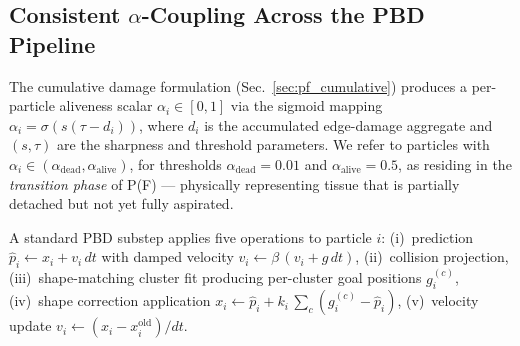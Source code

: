 %
%
%

\subsection{Consistent \texorpdfstring{$\alpha$}{α}-Coupling Across the PBD Pipeline}
\label{sec:alpha_coupling}

The cumulative damage formulation (Sec.~\ref{sec:pf_cumulative}) produces a
per-particle aliveness scalar $\alpha_i \in [0,1]$ via the sigmoid mapping
$\alpha_i = \sigma(s(\tau - d_i))$, where $d_i$ is the accumulated edge-damage
aggregate and $(s, \tau)$ are the sharpness and threshold parameters. We refer
to particles with $\alpha_i \in (\alpha_{\text{dead}}, \alpha_{\text{alive}})$,
for thresholds $\alpha_{\text{dead}}{=}0.01$ and
$\alpha_{\text{alive}}{=}0.5$, as residing in the \emph{transition phase} of
P(F) --- physically representing tissue that is partially detached but not yet
fully aspirated.

A standard PBD substep applies five operations to particle $i$:
(i)~prediction $\hat{p}_i \leftarrow x_i + v_i \, dt$ with damped velocity
$v_i \leftarrow \beta\,(v_i + g\,dt)$,
(ii)~collision projection,
(iii)~shape-matching cluster fit producing per-cluster goal positions $g_i^{(c)}$,
(iv)~shape correction application $x_i \leftarrow \hat{p}_i + k_i\,\sum_c (g_i^{(c)} - \hat{p}_i)$,
(v)~velocity update $v_i \leftarrow (x_i - x_i^{\text{old}})/dt$.

